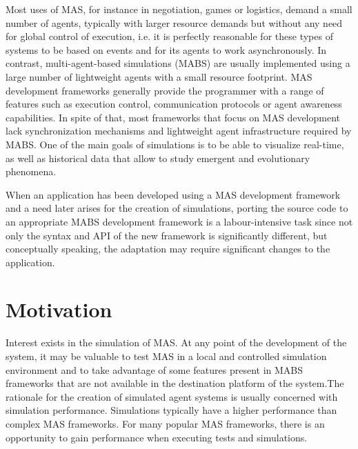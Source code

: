 Most uses of MAS, for instance in negotiation, games or logistics, demand a small number of agents, typically with larger resource demands but without any need for global control of execution, i.e. it is perfectly reasonable for these types of systems to be based on events and for its agents to work asynchronously. In contrast, multi-agent-based simulations (MABS) are usually implemented using a large number of lightweight agents with a small resource footprint. MAS development frameworks generally provide the programmer with a range of features such as execution control, communication protocols or agent awareness capabilities. In spite of that, most frameworks that focus on MAS development lack synchronization mechanisms and lightweight agent infrastructure required by MABS. One of the main goals of simulations is to be able to visualize real-time, as well as historical data that allow to study emergent and evolutionary phenomena. \cite{mengistu2008scalability}

When an application has been developed using a MAS development framework and a need later arises for the creation of simulations, porting the source code to an appropriate MABS development framework is a labour-intensive task since not only the syntax and API of the new framework is significantly different, but conceptually speaking, the adaptation may require significant changes to the application.


\section{Motivation}
Interest exists in the simulation of MAS. At any point of the development of the system, it may be valuable to test MAS in a local and controlled simulation environment and to take advantage of some features present in MABS frameworks that are not available in the destination platform of the system.The rationale for the creation of simulated agent systems is usually concerned with simulation performance. Simulations typically have a higher performance than complex MAS frameworks. For many popular MAS frameworks, there is an opportunity to gain performance when executing tests and simulations. 


